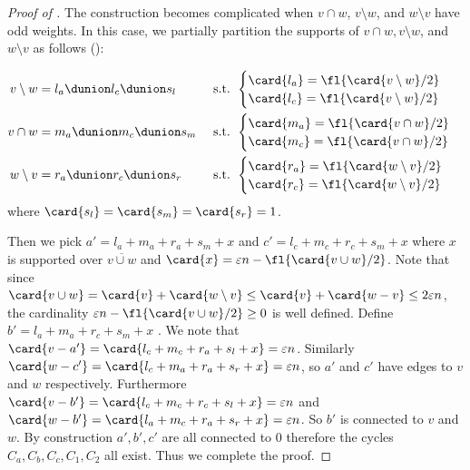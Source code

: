 \begin{proof}[Proof of ]
The construction becomes complicated when $ v\cap w$, $v\setminus w$, and $w\setminus v$ have odd weights. In this case, we partially partition the supports of $v\cap w, v\setminus w$, and $w\setminus v$ as follows ():

\begin{align*}
    v\setminus w &= l_a \dunion l_c \dunion s_l  &&\text{ s.t. } \begin{cases}
        \card{l_a} = \fl{\card{v\setminus w}/2}\\
        \card{l_c} = \fl{\card{v\setminus w}/2}
    \end{cases} \\
     v\cap w &= m_{a}\dunion m_{c}\dunion s_m &&\text{ s.t. } \begin{cases}
        \card{m_a} = \fl{\card{v\cap w}/2}\\
        \card{m_c} = \fl{\card{v\cap w}/2} 
    \end{cases} \\
     w\setminus v &= r_a \dunion r_c \dunion s_r &&\text{ s.t. } \begin{cases}
        \card{r_a} = \fl{\card{w\setminus v}/2}\\
        \card{r_c} = \fl{\card{w\setminus v}/2}
    \end{cases} 
\end{align*}
where $\card{s_l}=\card{s_m} = \card{s_r} =1$. 

Then we pick $a'=l_a + m_{a}+r_a+ s_m + x$ and $c'= l_c + m_{c}+r_c+s_m+x$ where $x$ is supported over $\overline{v \cup w}$ and $\card{x} = \varepsilon n - \fl{ \card{v\cup w}/2}$. Note that since $\card{v\cup w} = \card{v}+\card{w\setminus v} \le \card{v}+\card{w - v}  \le 2\varepsilon n$, the cardinality $\varepsilon n - \fl{\card{v\cup w}/2} \ge 0$ is well defined. Define $b' = l_a+m_{a}+r_c+ s_m + x$ 
. We note that $\card{v - a'} = \card{l_c+m_c+r_a+s_l+x} = \varepsilon n$. Similarly $\card{w - c'} = \card{l_c+m_a+r_a+s_r+x} = \varepsilon n$, so $a'$ and $c'$ have edges to $v$ and $w$ respectively. Furthermore $\card{ v - b'} = \card{l_c+m_c+r_c+s_l+x} = \varepsilon n$ and $\card{ w - b'} = \card{l_a + m_c+r_a+s_r+x} = \varepsilon n$. So $b'$ is connected to $v$ and $w$. By construction $a',b',c'$ are all connected to $0$ therefore the cycles $C_a,C_b,C_c,C_1,C_2$ all exist. Thus we complete the proof.
\end{proof}

